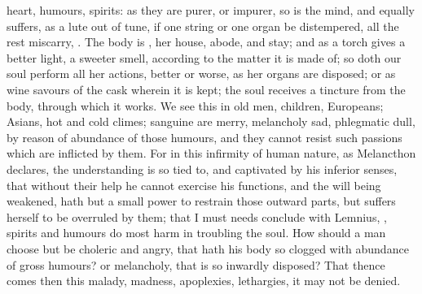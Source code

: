 heart, humours, spirits: as they are purer, or impurer, so
is the mind, and equally suffers, as a lute out of tune, if one string or one
organ be distempered, all the rest miscarry, . The body is
, her house, abode, and stay; and as a torch gives a
better light, a sweeter smell, according to the matter it is made of; so doth
our soul perform all her actions, better or worse, as her organs are disposed;
or as wine savours of the cask wherein it is kept; the soul receives a tincture
from the body, through which it works. We see this in old men, children,
Europeans; Asians, hot and cold climes; sanguine are merry, melancholy sad,
phlegmatic dull, by reason of abundance of those humours, and they cannot
resist such passions which are inflicted by them. For in this infirmity of
human nature, as Melancthon declares, the understanding is so tied to, and
captivated by his inferior senses, that without their help he cannot exercise
his functions, and the will being weakened, hath but a small power to restrain
those outward parts, but suffers herself to be overruled by them; that I must
needs conclude with Lemnius, , spirits and humours do most harm in troubling
the soul. How should a man choose but be choleric and angry, that hath his body
so clogged with abundance of gross humours? or melancholy, that is so inwardly
disposed? That thence comes then this malady, madness, apoplexies, lethargies,
\etc{} it may not be denied.

